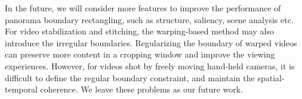 \documentclass[10pt,journal,compsoc]{IEEEtran}
\begin{document}
In the future, we will consider more features to improve the performance of panorama boundary rectangling, such as structure, saliency, scene analysis etc.
For video stabilization and stitching, the warping-based method may also introduce the irregular boundaries.
Regularizing the boundary of warped videos can preserve more content in a cropping window and improve the viewing experiences.
However, for videos shot by freely moving hand-held cameras, it is difficult to define the regular boundary constraint, and maintain the spatial-temporal coherence.
We leave these problems as our future work.





\end{document}

